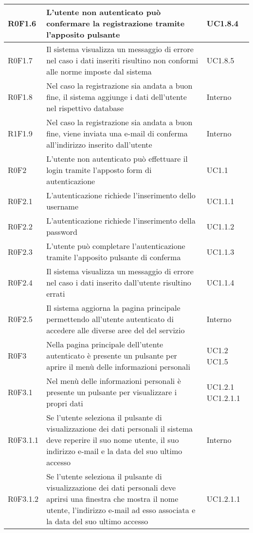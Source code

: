 \begin{center}
\begin{longtable}{| p{2cm} | p{8cm} | p{2cm} |}
		\hline
		R0F1.6  &  L'utente non autenticato può confermare la registrazione tramite l'apposito pulsante  &  UC1.8.4 \\
		\hline
		R0F1.7  &  Il sistema visualizza un messaggio di errore nel caso i dati inseriti risultino non conformi alle norme imposte dal sistema  &  UC1.8.5 \\
		\hline
		R0F1.8  &  Nel caso la registrazione sia andata a buon fine, il sistema aggiunge i dati dell'utente nel rispettivo database  &  Interno \\
		\hline
		R1F1.9  &  Nel caso la registrazione sia andata a buon fine, viene inviata una e-mail di conferma all'indirizzo inserito dall'utente  &  Interno \\
		\hline
		R0F2  &  L'utente non autenticato può effettuare il login tramite l'apposto form di autenticazione  &  UC1.1 \\
		\hline
		R0F2.1  &  L'autenticazione richiede l'inserimento dello username  &  UC1.1.1 \\
		\hline
		R0F2.2  &  L'autenticazione richiede l'inserimento della password  &  UC1.1.2 \\
		\hline
		R0F2.3  &  L'utente può completare l'autenticazione tramite l'apposito pulsante di conferma  &  UC1.1.3 \\
		\hline
		R0F2.4  &  Il sistema visualizza un messaggio di errore nel caso i dati inserito dall'utente risultino errati  &  UC1.1.4 \\
		\hline
		R0F2.5  &  Il sistema aggiorna la pagina principale permettendo all'utente autenticato di accedere alle diverse aree del del servizio  &  Interno  \\
		\hline
		R0F3  &  Nella pagina principale dell'utente autenticato è presente un pulsante per aprire il menù delle informazioni personali  &  UC1.2 \newline UC1.5 \\
		\hline
		R0F3.1  &  Nel menù delle informazioni personali è presente un pulsante per visualizzare i propri dati  &  UC1.2.1 \newline UC1.2.1.1 \\
		\hline
		R0F3.1.1  &  Se l'utente seleziona il pulsante di visualizzazione dei dati personali il sistema deve reperire il suo nome utente, il suo indirizzo e-mail e la data del suo ultimo accesso &  Interno \\
		\hline
		R0F3.1.2  &  Se l'utente seleziona il pulsante di visualizzazione dei dati personali deve aprirsi una finestra che mostra il nome utente, l'indirizzo e-mail ad esso associata e la data del suo ultimo accesso &  UC1.2.1.1 \\

\end{longtable}
\end{center}
